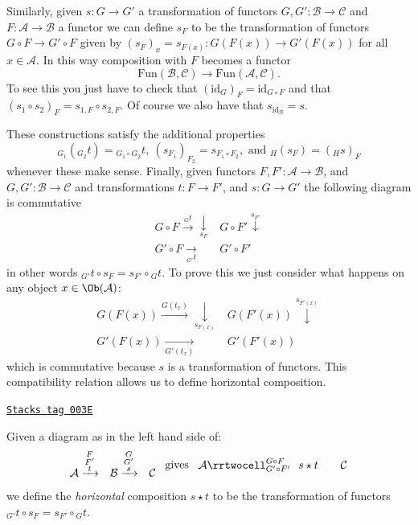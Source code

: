 \medskip\noindent
Similarly, given $s : G \to G'$ a transformation of
functors $G, G' : \mathcal{B} \to \mathcal{C}$ and
$F : \mathcal{A} \to \mathcal{B}$ a functor we can define
$s_F$ to be the transformation of functors
$G\circ F \to G' \circ F$ given by
$(s_F)_x = s_{F(x)} : G(F(x)) \to G'(F(x))$
for all $x \in \mathcal{A}$. In this way
composition with $F$ becomes a functor
$$
\text{Fun}(\mathcal{B}, \mathcal{C})
\longrightarrow
\text{Fun}(\mathcal{A}, \mathcal{C}).
$$
To see this you just have to check that
$(\text{id}_G)_F = \text{id}_{G\circ F}$ and that
$(s_1 \circ s_2)_F = s_{1, F} \circ s_{2, F}$.
Of course we also have that $s_{\text{id}_\mathcal{B}} = s$.

\medskip\noindent
These constructions satisfy the additional properties
$$
{}_{G_1}({}_{G_2}t) = {}_{G_1\circ G_2}t,
\ (s_{F_1})_{F_2} = s_{F_1 \circ F_2},
\text{ and }{}_H(s_F) = ({}_Hs)_F
$$
whenever these make sense.
Finally, given functors $F, F' : \mathcal{A} \to \mathcal{B}$,
and $G, G' : \mathcal{B} \to \mathcal{C}$ and transformations
$t : F \to F'$, and $s : G \to G'$ the following
diagram is commutative
$$
\begin{array}{cc}G \circ F \overset{{}_Gt}{\longrightarrow}\underset{s_F}{\downarrow} & G \circ F' \overset{s_{F'}}{\downarrow} \\ G' \circ F \underset{{}_{G'}t}{\longrightarrow} & G' \circ F'\end{array}
$$
in other words ${}_{G'}t \circ s_F = s_{F'}\circ {}_Gt$.
To prove this we just consider what happens on
any object $x \in \Ob(\mathcal{A})$:
$$
\begin{array}{cc}G(F(x)) \overset{G(t_x)}{\longrightarrow}\underset{s_{F(x)}}{\downarrow} & G(F'(x)) \overset{s_{F'(x)}}{\downarrow} \\ G'(F(x)) \underset{G'(t_x)}{\longrightarrow} & G'(F'(x))\end{array}
$$
which is commutative because $s$ is a transformation
of functors. This compatibility relation allows us
to define horizontal composition.

\begin{definition}
\label{categories-definition-horizontal-composition}
\href{https://stacks.math.columbia.edu/tag/003E}{\texttt{Stacks tag 003E}}

Given a diagram as in the left hand side of:
$$
\begin{array}{ccc}\mathcal{A}
\xrightarrow{\substack{F\\F'\\t}} & \mathcal{B}
\xrightarrow{\substack{G\\G'\\s}} & \mathcal{C}\end{array}
\text{ gives }
\begin{array}{ccc}\mathcal{A}
\rrtwocell^{G \circ F} _{G' \circ F'}{\ \ s \star t} &  & \mathcal{C}\end{array}
$$
we define the {\it horizontal} composition $s \star t$ to be the
transformation of functors ${}_{G'}t \circ s_F = s_{F'}\circ {}_Gt$.
\end{definition}

